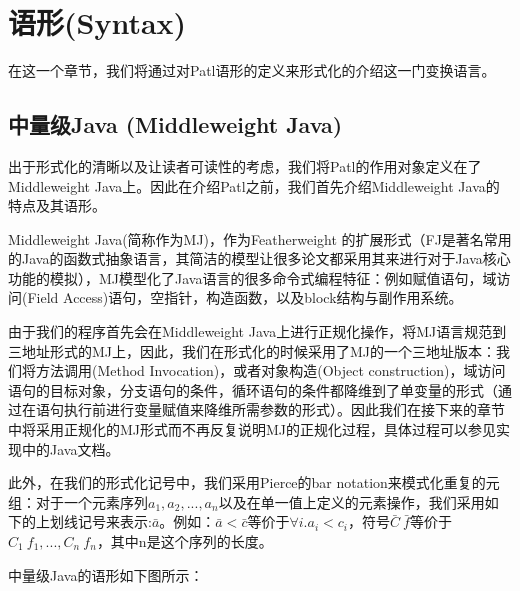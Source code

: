 
\chapter{语形(Syntax)}

在这一个章节，我们将通过对Patl语形的定义来形式化的介绍这一门变换语言。

\section{中量级Java (Middleweight Java)}
出于形式化的清晰以及让读者可读性的考虑，我们将Patl的作用对象定义在了Middleweight Java\cite{mj}上。因此在介绍Patl之前，我们首先介绍Middleweight Java的特点及其语形。

Middleweight Java(简称作为MJ)，作为Featherweight\cite{fj} 的扩展形式（FJ是著名常用的Java的函数式抽象语言，其简洁的模型让很多论文都采用其来进行对于Java核心功能的模拟），MJ模型化了Java语言的很多命令式编程特征：例如赋值语句，域访问(Field Access)语句，空指针，构造函数，以及block结构与副作用系统。

由于我们的程序首先会在Middleweight Java上进行正规化操作，将MJ语言规范到三地址形式的MJ上，因此，我们在形式化的时候采用了MJ的一个三地址版本：我们将方法调用(Method Invocation)，或者对象构造(Object construction)，域访问语句的目标对象，分支语句的条件，循环语句的条件都降维到了单变量的形式（通过在语句执行前进行变量赋值来降维所需参数的形式）。因此我们在接下来的章节中将采用正规化的MJ形式而不再反复说明MJ的正规化过程，具体过程可以参见实现中的Java文档。

此外，在我们的形式化记号中，我们采用Pierce\cite{tapl}的bar notation来模式化重复的元组：对于一个元素序列$a_1,a_2,...,a_n$以及在单一值上定义的元素操作，我们采用如下的上划线记号来表示:$\bar{a}$。例如：$\bar{a}<\bar{c}$等价于$\forall i. a_i < c_i$，符号$\bar{C}~\bar{f}$等价于$C_1~f_1,...,C_n~f_n$，其中n是这个序列的长度。

中量级Java的语形如下图所示：

